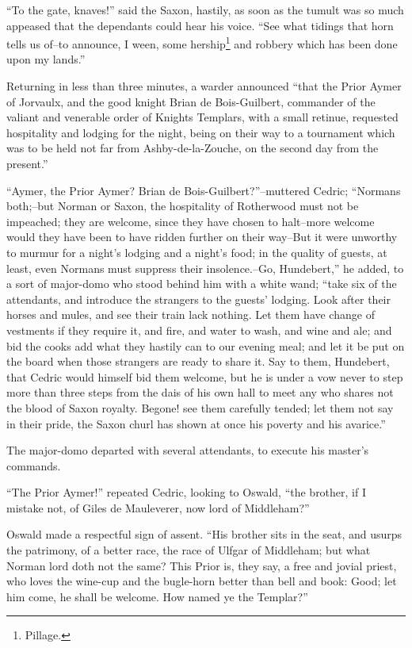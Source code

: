 ``To the gate, knaves!'' said the Saxon, hastily, as soon as the tumult
was so much appeased that the dependants could hear his voice. ``See
what tidings that horn tells us of--to announce, I ween, some
hership\footnote{Pillage.} and robbery which has been done upon my lands.''

Returning in less than three minutes, a warder announced ``that the
Prior Aymer of Jorvaulx, and the good knight Brian de Bois-Guilbert,
commander of the valiant and venerable order of Knights Templars, with a
small retinue, requested hospitality and lodging for the night, being on
their way to a tournament which was to be held not far from
Ashby-de-la-Zouche, on the second day from the present.''

``Aymer, the Prior Aymer? Brian de Bois-Guilbert?''--muttered Cedric;
``Normans both;--but Norman or Saxon, the hospitality of Rotherwood must
not be impeached; they are welcome, since they have chosen to halt--more
welcome would they have been to have ridden further on their way--But it
were unworthy to murmur for a night's lodging and a night's food; in the
quality of guests, at least, even Normans must suppress their
insolence.--Go, Hundebert,'' he added, to a sort of major-domo who stood
behind him with a white wand; ``take six of the attendants, and
introduce the strangers to the guests' lodging. Look after their horses
and mules, and see their train lack nothing. Let them have change of
vestments if they require it, and fire, and water to wash, and wine and
ale; and bid the cooks add what they hastily can to our evening meal;
and let it be put on the board when those strangers are ready to share
it. Say to them, Hundebert, that Cedric would himself bid them welcome,
but he is under a vow never to step more than three steps from the dais
of his own hall to meet any who shares not the blood of Saxon royalty.
Begone! see them carefully tended; let them not say in their pride, the
Saxon churl has shown at once his poverty and his avarice.''

The major-domo departed with several attendants, to execute his master's
commands.

``The Prior Aymer!'' repeated Cedric, looking to Oswald, ``the brother,
if I mistake not, of Giles de Mauleverer, now lord of Middleham?''

Oswald made a respectful sign of assent. ``His brother sits in the seat,
and usurps the patrimony, of a better race, the race of Ulfgar of
Middleham; but what Norman lord doth not the same? This Prior is, they
say, a free and jovial priest, who loves the wine-cup and the bugle-horn
better than bell and book: Good; let him come, he shall be welcome. How
named ye the Templar?''

